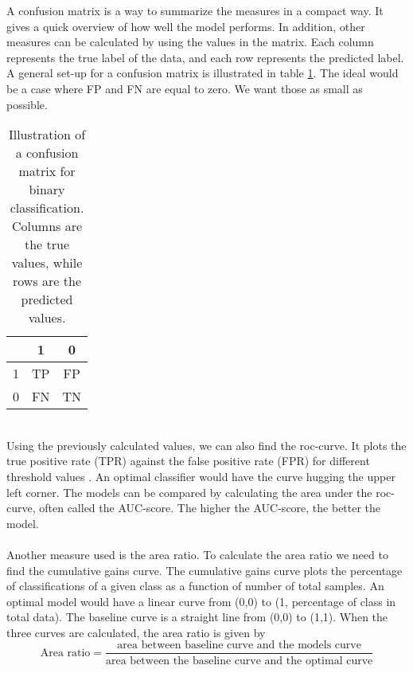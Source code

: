 A confusion matrix is a way to summarize the measures in a compact way. It gives a quick overview of how well the model performs.  In addition, other measures can be calculated by using the values in the matrix. Each column represents the true label of the data, and each row represents the predicted label. A general set-up for a confusion matrix is illustrated in table \ref{tab:confusion_matrix}. The ideal would be a case where FP and FN are equal to zero. We want those as small as possible. 
\begin{table}[h!]
    \centering
    \begin{tabular}{c|c|c}
         & 1 & 0 \\ \hline
        1 & TP & FP \\
        0 & FN & TN 
    \end{tabular}
    \caption{Illustration of a confusion matrix for binary classification. Columns are the true values, while rows are the predicted values.}
    \label{tab:confusion_matrix}
\end{table}
\\
Using the previously calculated values, we can also find the roc-curve. It plots the true positive rate (TPR) against the false positive rate (FPR) for different threshold values \cite{Hands-On}. An optimal classifier would have the curve hugging the upper left corner. The models can be compared by calculating the area under the roc-curve, often called the AUC-score. The higher the AUC-score, the better the model. 
\\
\\
Another measure used is the area ratio. To calculate the area ratio we need to find the cumulative gains curve. The cumulative gains curve plots the percentage of classifications of a given class as a function of number of total samples. An optimal model would have a linear curve from (0,0) to (1, percentage of class in total data). The baseline curve is a straight line from (0,0) to (1,1). When the three curves are calculated, the area ratio is given by 
\begin{equation}
    \text{Area ratio} = \frac{\text{area between baseline curve and the models curve}}{\text{area between the baseline curve and the optimal curve}}
\end{equation}
